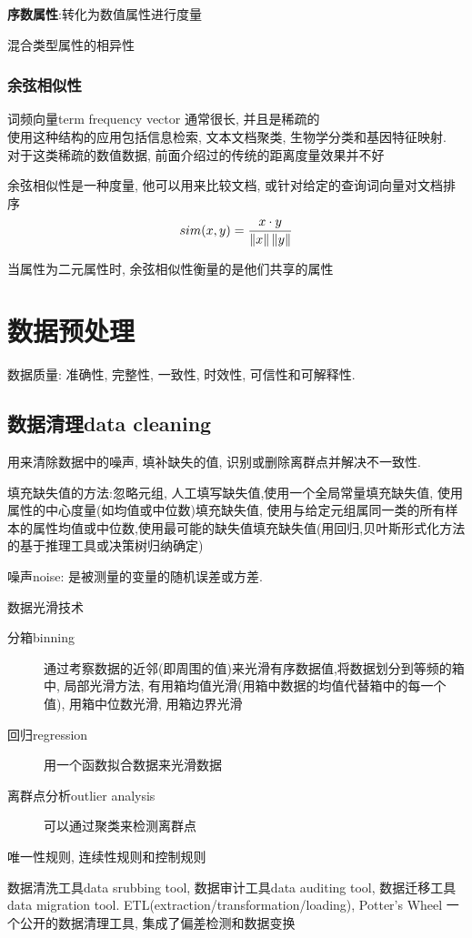 \documentclass{article}
\begin{document}
\textbf{序数属性}:转化为数值属性进行度量

混合类型属性的相异性

\subsubsection{余弦相似性}
词频向量term frequency vector 通常很长, 并且是稀疏的\\
使用这种结构的应用包括信息检索, 文本文档聚类, 生物学分类和基因特征映射.\\
对于这类稀疏的数值数据, 前面介绍过的传统的距离度量效果并不好

余弦相似性是一种度量, 他可以用来比较文档, 或针对给定的查询词向量对文档排序
$$sim(x,y) = \dfrac{x \cdot y}{\left\Vert x\right\Vert \left\Vert y\right\Vert}$$

当属性为二元属性时, 余弦相似性衡量的是他们共享的属性

\section{数据预处理}
数据质量: 准确性, 完整性, 一致性, 时效性, 可信性和可解释性.

\subsection{数据清理data cleaning}
用来清除数据中的噪声, 填补缺失的值, 识别或删除离群点并解决不一致性.

填充缺失值的方法:忽略元组, 人工填写缺失值,使用一个全局常量填充缺失值, 使用属性的中心度量(如均值或中位数)填充缺失值, 使用与给定元组属同一类的所有样本的属性均值或中位数,使用最可能的缺失值填充缺失值(用回归,贝叶斯形式化方法的基于推理工具或决策树归纳确定)

噪声noise: 是被测量的变量的随机误差或方差.

数据光滑技术
\begin{description}
	\item [分箱binning] 通过考察数据的近邻(即周围的值)来光滑有序数据值,将数据划分到等频的箱中, 局部光滑方法, 有用箱均值光滑(用箱中数据的均值代替箱中的每一个值), 用箱中位数光滑, 用箱边界光滑
	\item [回归regression] 用一个函数拟合数据来光滑数据
	\item [离群点分析outlier analysis] 可以通过聚类来检测离群点
\end{description}

唯一性规则, 连续性规则和控制规则

数据清洗工具data srubbing tool, 数据审计工具data auditing tool, 数据迁移工具data migration tool. ETL(extraction/transformation/loading), Potter's Wheel 一个公开的数据清理工具, 集成了偏差检测和数据变换
\end{document}
